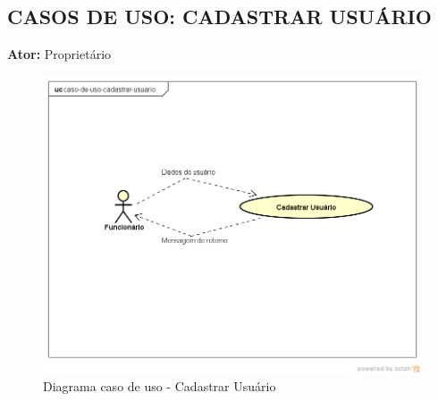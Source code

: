 \subsection{CASOS DE USO: CADASTRAR USUÁRIO}
\begin{flushleft}
\textbf{Ator:}  Proprietário
\end{flushleft}

\begin{figure}[htb]
	\caption{\label{fig_login} Diagrama caso de uso - Cadastrar Usuário}
	\begin{center}
	    \includegraphics[width=0.7\linewidth]{imagens/cadastrar-usuario.png}
	\end{center}
\end{figure}

\newpage

